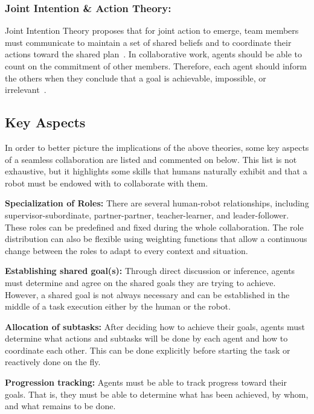 \subsubsection*{Joint Intention \& Action Theory:} 
Joint Intention Theory proposes that for joint action to emerge, team members must communicate to maintain a set of shared beliefs and to coordinate their actions toward the shared plan~\cite{cohen_teamwork_1991}. In collaborative work, agents should be able to count on the commitment of other members. Therefore, each agent should inform the others when they conclude that a goal is achievable, impossible, or irrelevant~\cite{hoffman2004collaboration}.

\subsection{Key Aspects}


In order to better picture the implications of the above theories, some key aspects of a seamless collaboration are listed and commented on below. This list is not exhaustive, but it highlights some skills that humans naturally exhibit and that a robot must be endowed with to collaborate with them. 

\textbf{Specialization of Roles:} There are several human-robot relationships, including supervisor-subordinate, partner-partner, teacher-learner, and leader-follower. These roles can be predefined and fixed during the whole collaboration. The role distribution can also be flexible using weighting functions that allow a continuous change between the roles to adapt to every context and situation.

\textbf{Establishing shared goal(s):} Through direct discussion or inference, agents must determine and agree on the shared goals they are trying to achieve. However, a shared goal is not always necessary and can be established in the middle of a task execution either by the human or the robot.

\textbf{Allocation of subtasks:} After deciding how to achieve their goals, agents must determine what actions and subtasks will be done by each agent and how to coordinate each other. This can be done explicitly before starting the task or reactively done on the fly.

\textbf{Progression tracking:} Agents must be able to track progress toward their goals. That is, they must be able to determine what has been achieved, by whom, and what remains to be done. 

